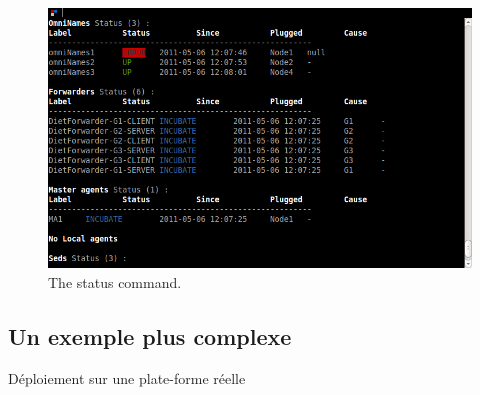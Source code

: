 \begin{figure}[h]
  \centering
  \includegraphics[width=12cm]{fig/6-StatusWithErrUpIncubate}
  \caption{The status command.\label{fig:GODIETStatus}}
\end{figure}

\subsection{Un exemple plus complexe}

Déploiement sur une plate-forme réelle
